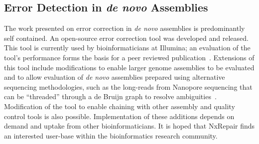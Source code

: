 \subsection{Error Detection in \emph{de novo} Assemblies}
The work presented on error correction in \emph{de novo} assemblies is predominantly self contained. An open-source error correction tool was developed and released. This tool is currently used by bioinformaticians at Illumina; an evaluation of the tool's performance forms the basis for a peer reviewed publication~\cite{murphy2015}. Extensions of this tool include modifications to enable larger genome assemblies to be evaluated and to allow evaluation of \emph{de novo} assemblies prepared using alternative sequencing methodologies, such as the long-reads from Nanopore sequencing that can be ``threaded'' through a de Bruijn graph to resolve ambiguities~\cite{Koren2015}. Modification of the tool to enable chaining with other assembly and quality control tools is also possible. Implementation of these additions depends on demand and uptake from other bioinformaticians. It is hoped that NxRepair finds an interested user-base within the bioinformatics research community.
